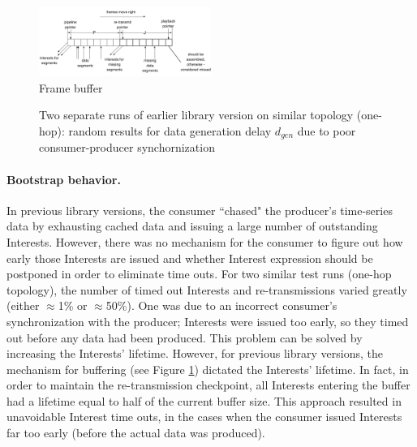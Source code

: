 \documentclass{icn/sig-alternate-2012} %
\begin{document}
\begin{figure}[t!]
\centering
\includegraphics[width=0.5\textwidth]{buffer}
\caption{Frame buffer}
\label{fig:old-buf}
\end{figure}

\begin{figure}[t!]
\centering


\caption{Two separate runs of earlier library version on similar topology (one-hop): random results for data generation delay $d_{gen}$ due to poor consumer-producer synchornization}
\label{fig:dgen}
\end{figure}

\paragraph{Bootstrap behavior.} In previous library versions, the consumer ``chased" the producer's time-series data by exhausting cached data and issuing a large number of outstanding Interests. However, there was no mechanism for the consumer to figure out how early those Interests are issued and whether Interest expression should be postponed in order to eliminate time outs. For two similar test runs (one-hop topology), the number of timed out Interests and re-transmissions varied greatly (either $\approx$1\% or $\approx$50\%). One was due to an incorrect consumer's synchronization with the producer; Interests were issued too early, so they timed out before any data had been produced. This problem can be solved by increasing the Interests' lifetime. However, for previous library versions, the mechanism for buffering (see Figure \ref{fig:old-buf}) dictated the Interests' lifetime. In fact, in order to maintain the re-transmission checkpoint, all Interests entering the buffer had a lifetime equal to half of the current buffer size. This approach resulted in unavoidable Interest time outs, in the cases when the consumer issued Interests far too early (before the actual data was produced).
\end{document}
